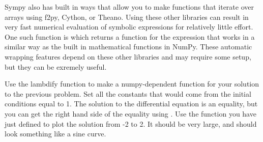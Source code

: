 Sympy also has built in ways that allow you to make functions that iterate over arrays using f2py, Cython, or Theano.
Using these other libraries can result in very fast numerical evaluation of symbolic expressions for relatively little effort.
One such function is  which returns a function for the expression that works in a similar way as the built in mathematical functions in NumPy. 
These automatic wrapping features depend on these other libraries and may require some setup, but they can be exremely useful.

\begin{problem}
Use the lambdify function to make a numpy-dependent function for your solution to the previous problem. Set all the constants that would come from the initial conditions equal to 1.
The solution to the differential equation is an equality, but you can get the right hand side of the equality using .
Use the function you have just defined to plot the solution from -2 to 2. 
It should be very large, and should look something like a sine curve.
\end{problem}